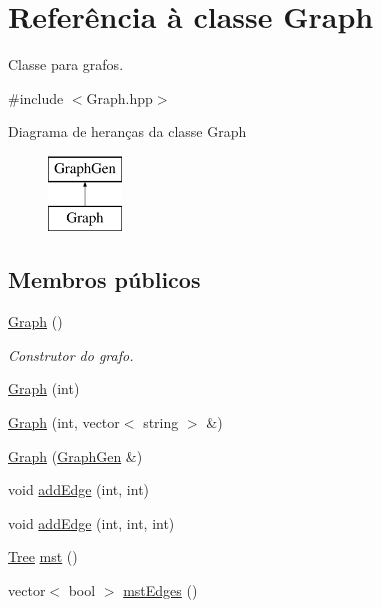 \hypertarget{classGraph}{}\section{Referência à classe Graph}
\label{classGraph}


Classe para grafos.  




{\ttfamily \#include $<$Graph.\+hpp$>$}

Diagrama de heranças da classe Graph\begin{figure}[H]
\begin{center}
\leavevmode
\includegraphics[height=2.000000cm]{classGraph}
\end{center}
\end{figure}
\subsection*{Membros públicos}
\begin{DoxyCompactItemize}
\item 
\mbox{\label{classGraph_ae4c72b8ac4d693c49800a4c7e273654f}} 
\mbox{\hyperlink{classGraph_ae4c72b8ac4d693c49800a4c7e273654f}{Graph}} ()
\begin{DoxyCompactList}\small\item\em Construtor do grafo. \end{DoxyCompactList}\item 
\mbox{\hyperlink{classGraph_a6381663d9f8215c377123a3a8107011c}{Graph}} (int)
\item 
\mbox{\hyperlink{classGraph_a0cb28a8601b14d0cb4291e5f60882ffc}{Graph}} (int, vector$<$ string $>$ \&)
\item 
\mbox{\hyperlink{classGraph_a0cd2695bebb326da026ed7391542aba6}{Graph}} (\mbox{\hyperlink{classGraphGen}{Graph\+Gen}} \&)
\item 
void \mbox{\hyperlink{classGraph_a9f627b8aaa697daabe0ed31bbd0953eb}{add\+Edge}} (int, int)
\item 
void \mbox{\hyperlink{classGraph_ad4155b07ec70e1d85787710452a2bcfa}{add\+Edge}} (int, int, int)
\item 
\mbox{\hyperlink{classTree}{Tree}} \mbox{\hyperlink{classGraph_a59f3bafa5e1935a2de4313b43219c4d6}{mst}} ()
\item 
vector$<$ bool $>$ \mbox{\hyperlink{classGraph_a645760818f3f2a20f8593b6b2a65c2d8}{mst\+Edges}} ()
\end{DoxyCompactItemize}

